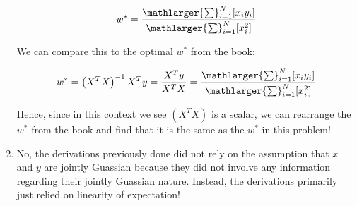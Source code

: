 \documentclass[submit]{harvardml}
\begin{document}
\begin{solution}
\begin{enumerate}
    \[w^* = \frac{\mathlarger{\sum}_{i=1}^N[x_iy_i]}{\mathlarger{\sum}_{i=1}^N[x_i^2]}\]
    
    We can compare this to the optimal $w^*$ from the book:
    
    \[w^* = \left(X^TX\right)^{-1}X^Ty = \frac{X^Ty}{X^TX} = \frac{\mathlarger{\sum}_{i=1}^N[x_iy_i]}{\mathlarger{\sum}_{i=1}^N[x_i^2]}\]
    
    Hence, since in this context we see $(X^TX)$ is a scalar, we can rearrange the $w^*$ from the book and find that it is the same as the $w^*$ in this problem!
    
    \item No, the derivations previously done did not rely on the assumption that $x$ and $y$ are jointly Guassian because they did not involve any information regarding their jointly Guassian nature. Instead, the derivations primarily just relied on linearity of expectation!
    
\end{enumerate}

\end{solution}

\newpage


\end{document}
